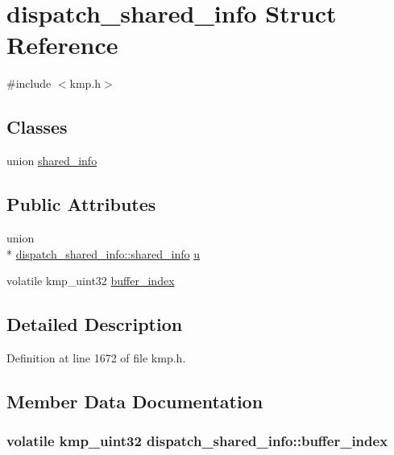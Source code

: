 \hypertarget{structdispatch__shared__info}{\section{dispatch\-\_\-shared\-\_\-info Struct Reference}
\label{structdispatch__shared__info}
}


{\ttfamily \#include $<$kmp.\-h$>$}

\subsection*{Classes}
\begin{DoxyCompactItemize}
\item 
union \hyperlink{uniondispatch__shared__info_1_1shared__info}{shared\-\_\-info}
\end{DoxyCompactItemize}
\subsection*{Public Attributes}
\begin{DoxyCompactItemize}
\item 
union \\*
\hyperlink{uniondispatch__shared__info_1_1shared__info}{dispatch\-\_\-shared\-\_\-info\-::shared\-\_\-info} \hyperlink{structdispatch__shared__info_a16b262849d490d72d9bad8b991fa6bb5}{u}
\item 
volatile kmp\-\_\-uint32 \hyperlink{structdispatch__shared__info_a06fda43aad26d2d3ee3c5ac9eaa96a95}{buffer\-\_\-index}
\end{DoxyCompactItemize}


\subsection{Detailed Description}


Definition at line 1672 of file kmp.\-h.



\subsection{Member Data Documentation}
\hypertarget{structdispatch__shared__info_a06fda43aad26d2d3ee3c5ac9eaa96a95}{
\subsubsection[{buffer\-\_\-index}]{\setlength{\rightskip}{0pt plus 5cm}volatile kmp\-\_\-uint32 dispatch\-\_\-shared\-\_\-info\-::buffer\-\_\-index}}\label{structdispatch__shared__info_a06fda43aad26d2d3ee3c5ac9eaa96a95}


